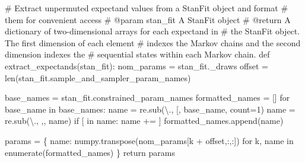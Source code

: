 \documentclass[
  letterpaper,
  DIV=11,
  numbers=noendperiod]{scrartcl}
\newenvironment{Shaded}{\begin{snugshade}}{\end{snugshade}}
\newcommand{\BuiltInTok}[1]{\textcolor[rgb]{0.00,0.23,0.31}{#1}}
\newcommand{\CommentTok}[1]{\textcolor[rgb]{0.37,0.37,0.37}{#1}}
\newcommand{\ControlFlowTok}[1]{\textcolor[rgb]{0.00,0.23,0.31}{#1}}
\newcommand{\DecValTok}[1]{\textcolor[rgb]{0.68,0.00,0.00}{#1}}
\newcommand{\KeywordTok}[1]{\textcolor[rgb]{0.00,0.23,0.31}{#1}}
\newcommand{\NormalTok}[1]{\textcolor[rgb]{0.00,0.23,0.31}{#1}}
\newcommand{\OperatorTok}[1]{\textcolor[rgb]{0.37,0.37,0.37}{#1}}
\newcommand{\StringTok}[1]{\textcolor[rgb]{0.13,0.47,0.30}{#1}}
\begin{document}
\begin{Shaded}
\begin{Highlighting}[]
\CommentTok{\# Extract unpermuted expectand values from a StanFit object and format }
\CommentTok{\# them for convenient access}
\CommentTok{\# @param stan\_fit A StanFit object}
\CommentTok{\# @return A dictionary of two{-}dimensional arrays for each expectand in }
\CommentTok{\#         the StanFit object.  The first dimension of each element }
\CommentTok{\#         indexes the Markov chains and the second dimension indexes the }
\CommentTok{\#         sequential states within each Markov chain. }
\KeywordTok{def}\NormalTok{ extract\_expectands(stan\_fit):}
\NormalTok{  nom\_params }\OperatorTok{=}\NormalTok{ stan\_fit.\_draws}
\NormalTok{  offset }\OperatorTok{=} \BuiltInTok{len}\NormalTok{(stan\_fit.sample\_and\_sampler\_param\_names)}
  
\NormalTok{  base\_names }\OperatorTok{=}\NormalTok{ stan\_fit.constrained\_param\_names}
\NormalTok{  formatted\_names }\OperatorTok{=}\NormalTok{ []}
  \ControlFlowTok{for}\NormalTok{ base\_name }\KeywordTok{in}\NormalTok{ base\_names:}
\NormalTok{    name }\OperatorTok{=}\NormalTok{ re.sub(}\StringTok{\textquotesingle{}\textbackslash{}.\textquotesingle{}}\NormalTok{, }\StringTok{\textquotesingle{}[\textquotesingle{}}\NormalTok{, base\_name, count}\OperatorTok{=}\DecValTok{1}\NormalTok{)}
\NormalTok{    name }\OperatorTok{=}\NormalTok{ re.sub(}\StringTok{\textquotesingle{}\textbackslash{}.\textquotesingle{}}\NormalTok{, }\StringTok{\textquotesingle{},\textquotesingle{}}\NormalTok{, name)}
    \ControlFlowTok{if} \StringTok{\textquotesingle{}[\textquotesingle{}} \KeywordTok{in}\NormalTok{ name:}
\NormalTok{      name }\OperatorTok{+=} \StringTok{\textquotesingle{}]\textquotesingle{}}
\NormalTok{    formatted\_names.append(name)}
  
\NormalTok{  params }\OperatorTok{=}\NormalTok{ \{ name: numpy.transpose(nom\_params[k }\OperatorTok{+}\NormalTok{ offset,:,:])}
             \ControlFlowTok{for}\NormalTok{ k, name }\KeywordTok{in} \BuiltInTok{enumerate}\NormalTok{(formatted\_names) \}}
  \ControlFlowTok{return}\NormalTok{ params}
\end{Highlighting}
\end{Shaded}
\end{document}
